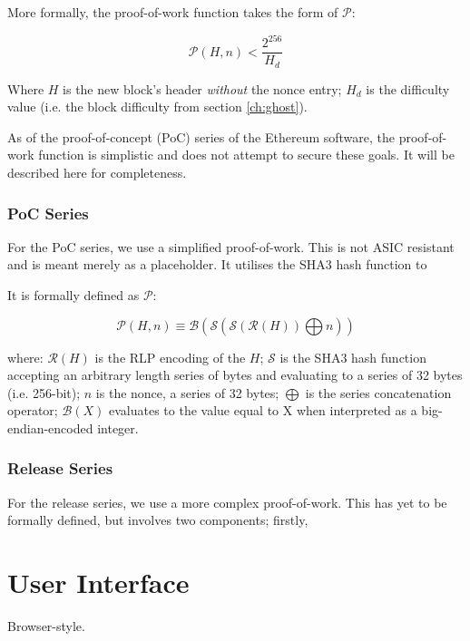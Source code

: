 \documentclass[9pt,oneside]{amsart}
\begin{document}
\begin{multicols}{2}
More formally, the proof-of-work function takes the form of $\mathcal{P}$:

\begin{equation}
\mathcal{P}(H, n) < \frac{2^{256}}{H_d}
\end{equation}

Where $H$ is the new block's header \textit{without} the nonce entry; $H_d$ is the difficulty value (i.e. the block difficulty from section \ref{ch:ghost}).

As of the proof-of-concept (PoC) series of the Ethereum software, the proof-of-work function is simplistic and does not attempt to secure these goals. It will be described here for completeness.

\subsubsection{PoC Series}

For the PoC series, we use a simplified proof-of-work. This is not ASIC resistant and is meant merely as a placeholder. It utilises the SHA3 hash function to 

It is formally defined as $\mathcal{P}$:

\begin{equation}
\mathcal{P}(H, n) \equiv \mathcal{B}(\mathcal{S}(\mathcal{S}(\mathcal{R}(H)) \bigoplus n))
\end{equation}

where:
$\mathcal{R}(H)$ is the RLP encoding of the $H$;
$\mathcal{S}$ is the SHA3 hash function accepting an arbitrary length series of bytes and evaluating to a series of 32 bytes (i.e. 256-bit);
$n$ is the nonce, a series of 32 bytes;
$\bigoplus$ is the series concatenation operator;
$\mathcal{B}(X)$ evaluates to the value equal to X when interpreted as a big-endian-encoded integer.

\subsubsection{Release Series}

For the release series, we use a more complex proof-of-work. This has yet to be formally defined, but involves two components; firstly, 

\section{User Interface}

Browser-style.


\end{multicols}
\end{document}
